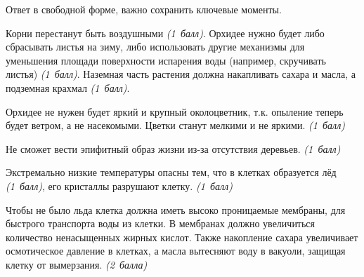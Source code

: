 \explanationSection

Ответ в свободной форме, важно сохранить ключевые моменты.

Корни перестанут быть воздушными \textit{(1~балл)}. Орхидее нужно будет либо сбрасывать листья на зиму, либо использовать другие механизмы для уменьшения площади поверхности испарения воды (например, скручивать листья) \textit{(1~балл)}. Наземная часть растения должна накапливать сахара и масла, а подземная крахмал \textit{(1~балл)}.

Орхидее не нужен будет яркий и крупный околоцветник, т.к. опыление теперь будет ветром, а не насекомыми. Цветки станут мелкими и не яркими. \textit{(1~балл)}

Не сможет вести эпифитный образ жизни из-за отсутствия деревьев. \textit{(1~балл)}

Экстремально низкие температуры опасны тем, что в клетках образуется лёд \textit{(1~балл)}, его кристаллы разрушают клетку. \textit{(1~балл)}

Чтобы не было льда клетка должна иметь высоко проницаемые мембраны, для быстрого транспорта воды из клетки. В мембранах должно увеличиться количество ненасыщенных жирных кислот. Также накопление сахара увеличивает осмотическое давление в клетках, а масла вытесняют воду в вакуоли, защищая клетку от вымерзания. \textit{(2~балла)}
